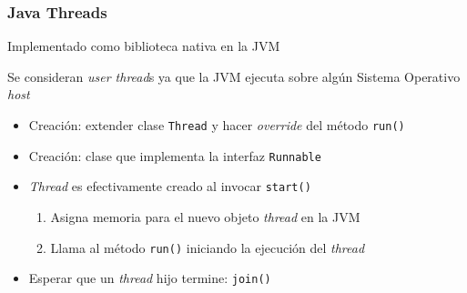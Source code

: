 \documentclass[letter]{beamer}
\begin{document}
\begin{frame}
  \frametitle{Java Threads}

  Implementado como biblioteca nativa en la JVM
  
  Se consideran {\em user thread}s ya que la JVM ejecuta sobre algún Sistema Operativo {\em host}
    
  \begin{itemize}
    \item Creación: extender clase {\tt Thread} y hacer {\em override} del método {\tt run()}
    \item Creación: clase que implementa la interfaz {\tt Runnable}
    \item {\em Thread} es efectivamente creado al invocar {\tt start()}
      \begin{enumerate}
        \item Asigna memoria para el nuevo objeto {\em thread} en la JVM
        \item Llama al método {\tt run()} iniciando la ejecución del {\em thread}
      \end{enumerate}
    \item Esperar que un {\em thread} hijo termine: {\tt join()}
  \end{itemize}
  
\end{frame}
\end{document}
